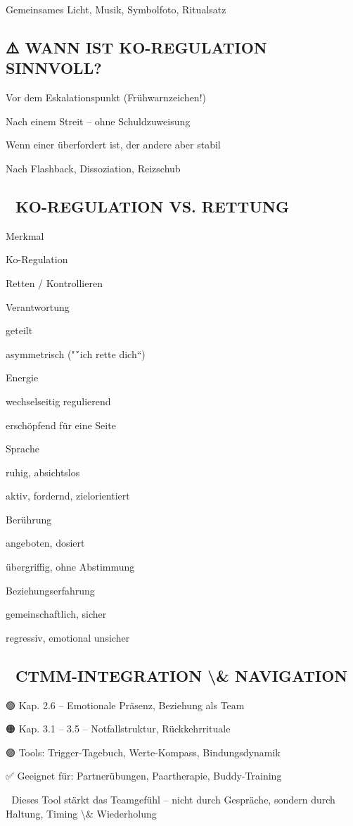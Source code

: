 Gemeinsames Licht, Musik, Symbolfoto, Ritualsatz

\subsection{⚠️ WANN IST KO-REGULATION SINNVOLL?}

Vor dem Eskalationspunkt (Frühwarnzeichen!)

Nach einem Streit -- ohne Schuldzuweisung

Wenn einer überfordert ist, der andere aber stabil

Nach Flashback, Dissoziation, Reizschub

\subsection{🔁 KO-REGULATION VS. RETTUNG}

Merkmal

Ko-Regulation

Retten / Kontrollieren

Verantwortung

geteilt

asymmetrisch ("\'`ich rette dich“)

Energie

wechselseitig regulierend

erschöpfend für eine Seite

Sprache

ruhig, absichtslos

aktiv, fordernd, zielorientiert

Berührung

angeboten, dosiert

übergriffig, ohne Abstimmung

Beziehungserfahrung

gemeinschaftlich, sicher

regressiv, emotional unsicher

\subsection{🧭 CTMM-INTEGRATION \textbackslash{}& NAVIGATION}

🟢 Kap. 2.6 -- Emotionale Präsenz, Beziehung als Team

🟠 Kap. 3.1 -- 3.5 -- Notfallstruktur, Rückkehrrituale

🟣 Tools: Trigger-Tagebuch, Werte-Kompass, Bindungsdynamik

✅ Geeignet für: Partnerübungen, Paartherapie, Buddy-Training

📎 Dieses Tool stärkt das Teamgefühl -- nicht durch Gespräche, sondern durch Haltung, Timing \textbackslash{}& Wiederholung
